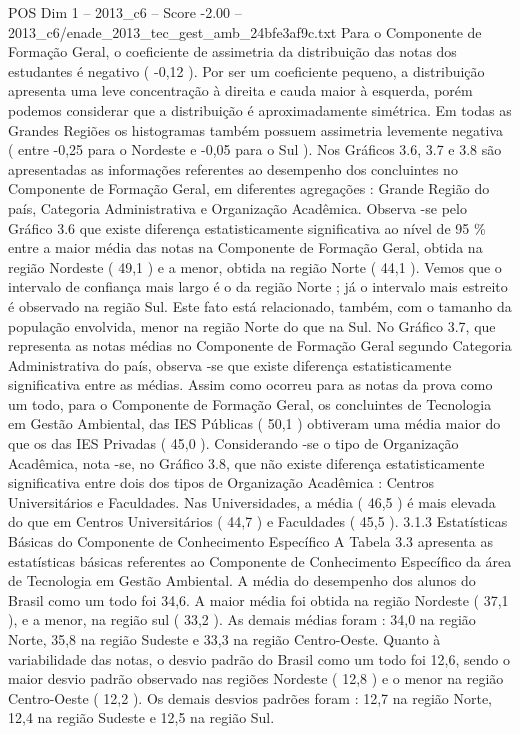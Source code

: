 \begin{textsample}{POS Dim 1 – 2013\_c6 – Score -2.00 – 2013\_c6/enade\_2013\_tec\_gest\_amb\_24bfe3af9c.txt}
Para o Componente de Formação Geral, o coeficiente de assimetria da distribuição das notas dos estudantes é negativo ( -0,12 ).
Por ser um coeficiente pequeno, a distribuição apresenta uma leve concentração à direita e cauda maior à esquerda, porém podemos considerar que a distribuição é aproximadamente simétrica.
Em todas as Grandes Regiões os histogramas também possuem assimetria levemente negativa ( entre -0,25 para o Nordeste e -0,05 para o Sul ).
Nos Gráficos 3.6, 3.7 e 3.8 são apresentadas as informações referentes ao desempenho dos concluintes no Componente de Formação Geral, em diferentes agregações : Grande Região do país, Categoria Administrativa e Organização Acadêmica.
Observa -se pelo Gráfico 3.6 que existe diferença estatisticamente significativa ao nível de 95 \% entre a maior média das notas na Componente de Formação Geral, obtida na região Nordeste ( 49,1 ) e a menor, obtida na região Norte ( 44,1 ).
Vemos que o intervalo de confiança mais largo é o da região Norte ; já o intervalo mais estreito é observado na região Sul.
Este fato está relacionado, também, com o tamanho da população envolvida, menor na região Norte do que na Sul.
No Gráfico 3.7, que representa as notas médias no Componente de Formação Geral segundo Categoria Administrativa do país, observa -se que existe diferença estatisticamente significativa entre as médias.
Assim como ocorreu para as notas da prova como um todo, para o Componente de Formação Geral, os concluintes de Tecnologia em Gestão Ambiental, das IES Públicas ( 50,1 ) obtiveram uma média maior do que os das IES Privadas ( 45,0 ).
Considerando -se o tipo de Organização Acadêmica, nota -se, no Gráfico 3.8, que não existe diferença estatisticamente significativa entre dois dos tipos de Organização Acadêmica : Centros Universitários e Faculdades.
Nas Universidades, a média ( 46,5 ) é mais elevada do que em Centros Universitários ( 44,7 ) e Faculdades ( 45,5 ). 3.1.3 Estatísticas Básicas do Componente de Conhecimento Específico A Tabela 3.3 apresenta as estatísticas básicas referentes ao Componente de Conhecimento Específico da área de Tecnologia em Gestão Ambiental.
A média do desempenho dos alunos do Brasil como um todo foi 34,6.
A maior média foi obtida na região Nordeste ( 37,1 ), e a menor, na região sul ( 33,2 ).
As demais médias foram : 34,0 na região Norte, 35,8 na região Sudeste e 33,3 na região Centro-Oeste.
Quanto à variabilidade das notas, o desvio padrão do Brasil como um todo foi 12,6, sendo o maior desvio padrão observado nas regiões Nordeste ( 12,8 ) e o menor na região Centro-Oeste ( 12,2 ).
Os demais desvios padrões foram : 12,7 na região Norte, 12,4 na região Sudeste e 12,5 na região Sul.

\end{textsample}

